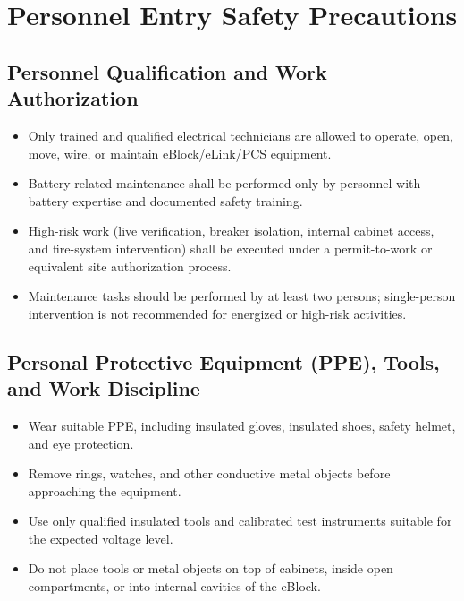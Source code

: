 \documentclass[11pt, a4paper]{article}
\begin{document}
\section{Personnel Entry Safety Precautions}
\subsection{Personnel Qualification and Work Authorization}
\begin{itemize}[leftmargin=1.5em]
    \item Only trained and qualified electrical technicians are allowed to operate, open, move, wire, or maintain eBlock/eLink/PCS equipment.
    \item Battery-related maintenance shall be performed only by personnel with battery expertise and documented safety training.
    \item High-risk work (live verification, breaker isolation, internal cabinet access, and fire-system intervention) shall be executed under a permit-to-work or equivalent site authorization process.
    \item Maintenance tasks should be performed by at least two persons; single-person intervention is not recommended for energized or high-risk activities.
\end{itemize}

\subsection{Personal Protective Equipment (PPE), Tools, and Work Discipline}
\begin{itemize}[leftmargin=1.5em]
    \item Wear suitable PPE, including insulated gloves, insulated shoes, safety helmet, and eye protection.
    \item Remove rings, watches, and other conductive metal objects before approaching the equipment.
    \item Use only qualified insulated tools and calibrated test instruments suitable for the expected voltage level.
    \item Do not place tools or metal objects on top of cabinets, inside open compartments, or into internal cavities of the eBlock.
\end{itemize}
\end{document}
